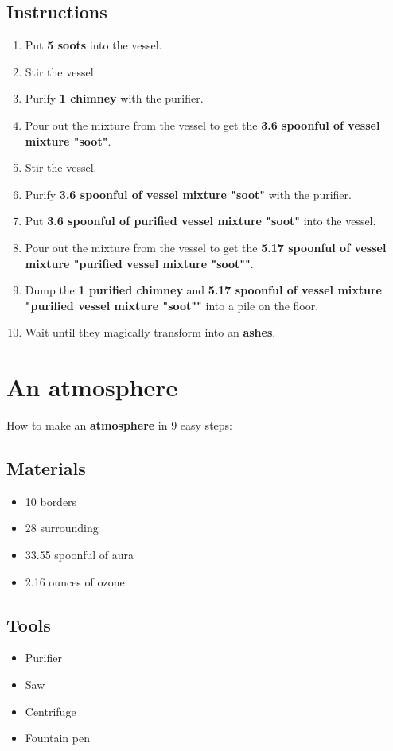 \documentclass{article}
\begin{document}
\subsection{Instructions}\begin{enumerate}
\item 
Put \textbf{5 soots} into the vessel.
\item 
Stir the vessel.
\item 
Purify \textbf{1 chimney} with the purifier.
\item 
Pour out the mixture from the vessel to get the \textbf{3.6 spoonful of vessel mixture "soot"}.
\item 
Stir the vessel.
\item 
Purify \textbf{3.6 spoonful of vessel mixture "soot"} with the purifier.
\item 
Put \textbf{3.6 spoonful of purified vessel mixture "soot"} into the vessel.
\item 
Pour out the mixture from the vessel to get the \textbf{5.17 spoonful of vessel mixture "purified vessel mixture "soot""}.
\item 
Dump the \textbf{1 purified chimney} and \textbf{5.17 spoonful of vessel mixture "purified vessel mixture "soot""} into a pile on the floor.
\item 
Wait until they magically transform into an \textbf{ashes}.
\end{enumerate}
\newpage
\section{An atmosphere}How to make an \textbf{atmosphere} in 9 easy steps:

\subsection{Materials}\begin{itemize}
\item 
10 borders
\item 
28 surrounding
\item 
33.55 spoonful of aura
\item 
2.16 ounces of ozone
\end{itemize}
\subsection{Tools}\begin{itemize}
\item 
Purifier
\item 
Saw
\item 
Centrifuge
\item 
Fountain pen
\end{itemize}
\end{document}
